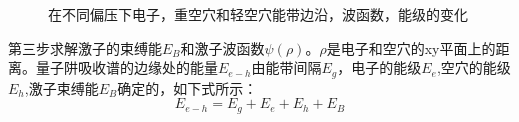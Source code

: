 \begin{figure}[htb]
	\small
	\caption{在不同偏压下电子，重空穴和轻空穴能带边沿，波函数，能级的变化}
	\label{fig_ch2_bias_wavefunction}	
\end{figure}
		
第三步求解激子的束缚能$E_B$和激子波函数$\psi(\rho)$。$\rho$是电子和空穴的xy平面上的距离。量子阱吸收谱的边缘处的能量$E_{e-h}$由能带间隔$E_g$，电子的能级$E_e$,空穴的能级$E_h$,激子束缚能$E_B$确定的，如下式所示：
\begin{equation}
\label{Equ:Eeh}
E_{e-h} = E_g + E_e + E_h + E_B
\end{equation}

